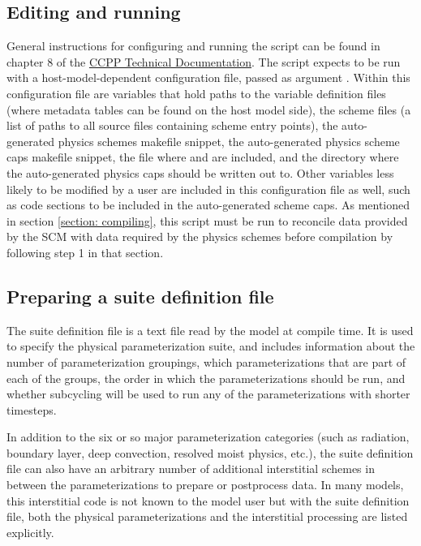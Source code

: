 \subsection{Editing and running }

General instructions for configuring and running the  script can be found in chapter 8 of the \href{https://ccpp-techdoc.readthedocs.io/en/v5.0.0/}{CCPP Technical Documentation}. The script expects to be run with a host-model-dependent configuration file, passed as argument . Within this configuration file are variables that hold paths to the variable definition files (where metadata tables can be found on the host model side), the scheme files (a list of paths to all source files containing scheme entry points), the auto-generated physics schemes makefile snippet, the auto-generated physics scheme caps makefile snippet, the file where  and  are included, and the directory where the auto-generated physics caps should be written out to. Other variables less likely to be modified by a user are included in this configuration file as well, such as code sections to be included in the auto-generated scheme caps. As mentioned in section \ref{section: compiling}, this script must be run to reconcile data provided by the SCM with data required by the physics schemes before compilation by following step 1 in that section.

\subsection{Preparing a suite definition file}
The suite definition file is a text file read by the model at compile time. It is used to specify the physical parameterization suite, and includes information about the number of parameterization groupings, which parameterizations that are part of each of the groups, the order in which the parameterizations should be run, and whether subcycling will be used to run any of the parameterizations with shorter timesteps.

In addition to the six or so major parameterization categories (such as radiation, boundary layer, deep convection, resolved moist physics, etc.), the suite definition file can also have an arbitrary number of additional interstitial schemes in between the parameterizations to prepare or postprocess data. In many models, this interstitial code is not known to the model user but with the suite definition file, both the physical parameterizations and the interstitial processing are listed explicitly.

